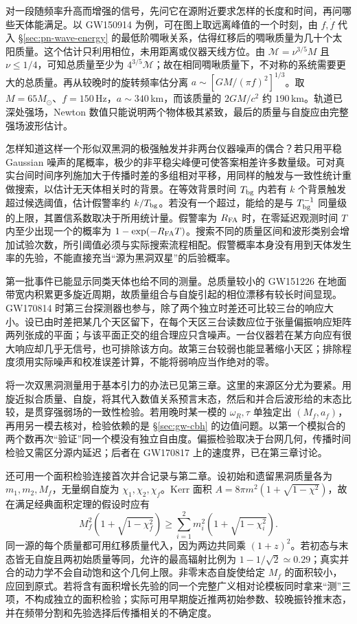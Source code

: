 对一段随频率升高而增强的信号，先问它在源附近要求怎样的长度和时间，再问哪些天体能满足。以 GW150914 为例，可在图上取远离峰值的一个时刻，由 $f,\dot f$ 代入 \S\ref{sec:pn-wave-energy} 的最低阶啁啾关系，估得红移后的啁啾质量为几十个太阳质量。这个估计只利用相位，未用距离或仪器天线方位。由 $\mathcal M=\nu^{3/5}M$ 且 $\nu\le1/4$，可知总质量至少为 $4^{3/5}\mathcal M$；故在相同啁啾质量下，不对称的系统需要更大的总质量。再从较晚时的旋转频率估分离 $a\sim[GM/(\pi f)^2]^{1/3}$。取 $M=65M_\odot$、$f=150$\,Hz，$a\sim340$\,km，而该质量的 $2GM/c^2$ 约 $190$\,km。轨道已深处强场，Newton 数值只能说明两个物体极其紧致，最后的质量与自旋应由完整强场波形估计。

怎样知道这样一个形似双黑洞的极强触发并非两台仪器噪声的偶合？若只用平稳 Gaussian 噪声的尾概率，极少的非平稳尖峰便可使答案相差许多数量级。可对真实台间时间序列施加大于传播时差的多组相对平移，用同样的触发与一致性统计重做搜索，以估计无天体相关时的背景。在等效背景时间 $T_{\rm bg}$ 内若有 $k$ 个背景触发超过候选阈值，估计假警率约 $k/T_{\rm bg}$。若没有一个超过，能给的是与 $T_{\rm bg}^{-1}$ 同量级的上限，其置信系数取决于所用统计量。假警率为 $R_{\rm FA}$ 时，在零延迟观测时间 $T$ 内至少出现一个的概率为 $1-\exp(-R_{\rm FA}T)$。搜索不同的质量区间和波形类别会增加试验次数，所引阈值必须与实际搜索流程相配。假警概率本身没有用到天体发生率的先验，不能直接充当“源为黑洞双星”的后验概率。

第一批事件已能显示同类天体也给不同的测量。总质量较小的 GW151226 在地面带宽内积累更多旋近周期，故质量组合与自旋引起的相位漂移有较长时间显现。GW170814 时第三台探测器也参与，除了两个独立时差还可比较三台的响应大小。设已由时差把某几个天区留下，在每个天区三台读数应位于张量偏振响应矩阵两列张成的平面；与该平面正交的组合理应只含噪声。一台仪器若在某方向应有很大响应却几乎无信号，也可排除该方向。故第三台较弱也能显著缩小天区；排除程度须用实际噪声和校准误差计算，不能将弱响应当作绝对的零。

将一次双黑洞测量用于基本引力的办法已见第三章。这里的来源区分尤为要紧。用旋近拟合质量、自旋，将其代入数值关系预言末态，然后和并合后波形给的末态比较，是贯穿强弱场的一致性检验。若用晚时某一模的 $\omega_R,\tau$ 单独定出 $(M_f,a_f)$，再用另一模去核对，检验依赖的是 \S\ref{sec:gw-cbh} 的边值问题。以第一个模拟合的两个数再次“验证”同一个模没有独立自由度。偏振检验取决于台网几何，传播时间检验又需区分源内延迟；后者在 GW170817 上的速度界，已在第三章讨论。

还可用一个面积检验连接首次并合记录与第二章。设初始和遗留黑洞质量各为 $m_1,m_2,M_f$，无量纲自旋为 $\chi_1,\chi_2,\chi_f$。Kerr 面积 $A=8\pi m^2(1+\sqrt{1-\chi^2})$，故在满足经典面积定理的假设时应有
\[
 M_f^2\left(1+\sqrt{1-\chi_f^2}\right)
 \ge \sum_{i=1}^2 m_i^2\left(1+\sqrt{1-\chi_i^2}\right).
\]
同一源的每个质量都可用红移质量代入，因为两边共同乘 $(1+z)^2$。若初态与末态皆无自旋且两初始质量等同，允许的最高辐射比例为 $1-1/\sqrt2\simeq0.29$；真实并合的动力学不会自动饱和这个几何上限。非零末态自旋使给定 $M_f$ 的面积较小，应回到原式。若将含有面积增长先验的同一个完整广义相对论模板同时拿来“测”三项，不构成独立的面积检验；实际可用早期旋近推两初始参数、较晚振铃推末态，并在频带分割和先验选择后传播相关的不确定度。

